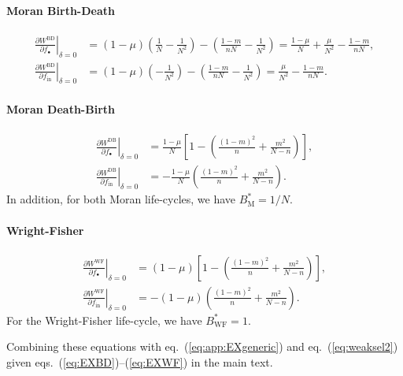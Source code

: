 \documentclass[11pt, letterpaper]{article}
\renewcommand{\eqref}[1]{\textup{{\normalfont eq.~(\ref{#1}}\normalfont)}}
\newcommand{\eqrefnoeq}[1]{(\ref{#1})}
\newcommand{\deriv}[2]{\partial_{#2}\!{#1}\,}
\newcommand{\derivv}[3]{\left.\frac{\partial #1}{\partial #2}\right |_{#3=0}} %
\newcommand{\Moran}{\textrm{M}}
\newcommand{\BD}{\textrm{BD}}
\newcommand{\DB}{\textrm{DB}}
\newcommand{\WF}{\textrm{WF}}
\newcommand{\inn}{\textrm{in}}
\newcommand{\focal}{\bullet}
\newcommand{\selstr}{\delta}
\begin{document}
\paragraph{Moran Birth-Death}
\begin{subequations}\label{eq:dWBD}
\begin{align}
\derivv{W^{\BD}}{f_{\focal}}{\selstr} &= (1-\mu) \left(\frac{1}{N} - \frac{1}{N^2}\right) - \left( \frac{1-m}{n N} - \frac{1}{N^2} \right) = \frac{1-\mu}{N} + \frac{\mu}{N^2} - \frac{1-m}{n N}, \\
\derivv{W^{\BD}}{f_{\inn}}{\selstr} &= (1-\mu) \left(- \frac{1}{N^2}\right) - \left( \frac{1-m}{n N} - \frac{1}{N^2} \right) = \frac{\mu}{N^2} - \frac{1-m}{n N}.
\end{align}
\end{subequations}

\paragraph{Moran Death-Birth}
\begin{subequations}\label{eq:dWDB}
\begin{align}
\derivv{W^{\DB}}{f_{\focal}}{\selstr} &= \frac{1-\mu}{N} \left[ 1 - \left( \frac{(1-m)^2}{n} + \frac{m^2}{N-n}  \right) \right],\\
\derivv{W^{\DB}}{f_{\inn}}{\selstr} &= - \frac{1-\mu}{N} \left( \frac{(1-m)^2}{n} + \frac{m^2}{N-n}  \right). 
\end{align}
\end{subequations}
%
In addition, for both Moran life-cycles, we have $B^{*}_\Moran = 1/N$.
\paragraph{Wright-Fisher}
\begin{subequations}\label{eq:dWWF}
\begin{align}
\derivv{W^{\WF}}{f_{\focal}}{\selstr} &= (1-\mu) \left[ 1 - \left( \frac{(1-m)^2}{n} + \frac{m^2}{N-n}  \right) \right],\\
\derivv{W^{\WF}}{f_{\inn}}{\selstr} &= - (1-\mu) \left( \frac{(1-m)^2}{n} + \frac{m^2}{N-n}  \right). 
\end{align}
\end{subequations}
For the Wright-Fisher life-cycle, we have $B^*_{\WF} = 1$.

Combining these equations with \eqref{eq:app:EXgeneric} and \eqref{eq:weaksel2} given eqs.~\eqrefnoeq{eq:EXBD}--\eqrefnoeq{eq:EXWF} in the main text.
\clearpage
\end{document}
